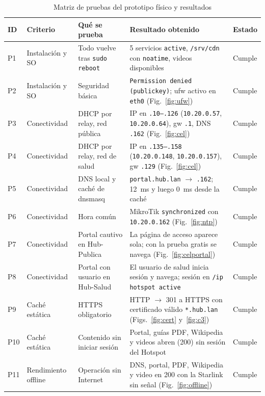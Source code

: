 \documentclass[conference]{IEEEtran}
\begin{document}
\begin{table}[!t]
\centering
\caption{Matriz de pruebas del prototipo físico y resultados}
\label{tab:pruebas}
\scriptsize
\begin{tabularx}{\textwidth}{lP{2.1cm}P{4.2cm}Yl}
\toprule
\textbf{ID} & \textbf{Criterio} & \textbf{Qué se prueba} & \textbf{Resultado obtenido} & \textbf{Estado} \\
\midrule
P1 & Instalación y SO & Todo vuelve tras \texttt{sudo reboot} & 5 servicios \texttt{active}, \texttt{/srv/cdn} con \texttt{noatime}, videos disponibles & Cumple \\
P2 & Instalación y SO & Seguridad básica & \texttt{Permission denied (publickey)}; ufw activo en \texttt{eth0} (Fig.~\ref{fig:ufw}) & Cumple \\
P3 & Conectividad & DHCP por relay, red pública & IP en \texttt{.10--.126} (\texttt{10.20.0.57}, \texttt{10.20.0.64}), gw \texttt{.1}, DNS \texttt{.162} (Fig.~\ref{fig:cel}) & Cumple \\
P4 & Conectividad & DHCP por relay, red de salud & IP en \texttt{.135--.158} (\texttt{10.20.0.148}, \texttt{10.20.0.157}), gw \texttt{.129} (Fig.~\ref{fig:cel}) & Cumple \\
P5 & Conectividad & DNS local y caché de dnsmasq & \texttt{portal.hub.lan} $\rightarrow$ \texttt{.162}; 12~ms y luego 0~ms desde la caché & Cumple \\
P6 & Conectividad & Hora común & MikroTik \texttt{synchronized} con \texttt{10.20.0.162} (Fig.~\ref{fig:ntp}) & Cumple \\
P7 & Conectividad & Portal cautivo en Hub-Publica & La página de acceso aparece sola; con la prueba gratis se navega (Fig.~\ref{fig:celportal}) & Cumple \\
P8 & Conectividad & Portal con usuario en Hub-Salud & El usuario de salud inicia sesión y navega; sesión en \texttt{/ip hotspot active} & Cumple \\
P9 & Caché estática & HTTPS obligatorio & HTTP $\rightarrow$ 301 a HTTPS con certificado válido \texttt{*.hub.lan} (Figs.~\ref{fig:cert} y~\ref{fig:c3}) & Cumple \\
P10 & Caché estática & Contenido sin iniciar sesión & Portal, guías PDF, Wikipedia y videos abren (200) sin sesión del Hotspot & Cumple \\
P11 & Rendimiento offline & Operación sin Internet & DNS, portal, PDF, Wikipedia y video en 200 con la Starlink sin señal (Fig.~\ref{fig:offline}) & Cumple \\

\end{tabularx}
\end{table}
\end{document}
